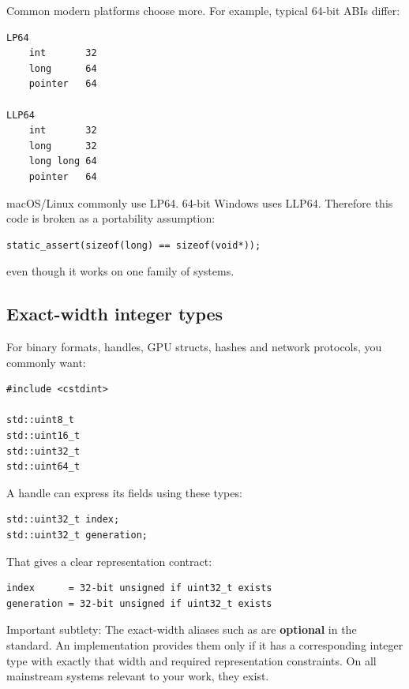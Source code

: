 Common modern platforms choose more. For example, typical 64-bit ABIs differ:

\begin{verbatim}
LP64
    int       32
    long      64
    pointer   64

LLP64
    int       32
    long      32
    long long 64
    pointer   64
\end{verbatim}

macOS/Linux commonly use LP64. 64-bit Windows uses LLP64. Therefore this code is broken as a portability assumption:

\begin{verbatim}
static_assert(sizeof(long) == sizeof(void*));
\end{verbatim}

even though it works on one family of systems.

\subsection{Exact-width integer types}\label{01-foundations-i-ch002-exact-width-integer-types}

\hypertarget{01-foundations-i-ch002-exact-width-integer-types}{}

For binary formats, handles, GPU structs, hashes and network protocols, you commonly want:

\begin{verbatim}
#include <cstdint>

std::uint8_t
std::uint16_t
std::uint32_t
std::uint64_t
\end{verbatim}

A handle can express its fields using these types:

\begin{verbatim}
std::uint32_t index;
std::uint32_t generation;
\end{verbatim}

That gives a clear representation contract:

\begin{verbatim}
index      = 32-bit unsigned if uint32_t exists
generation = 32-bit unsigned if uint32_t exists
\end{verbatim}

Important subtlety: The exact-width aliases such as  are \textbf{optional} in the standard. An implementation provides them only if it has a corresponding integer type with exactly that width and required representation constraints. On all mainstream systems relevant to your work, they exist.

